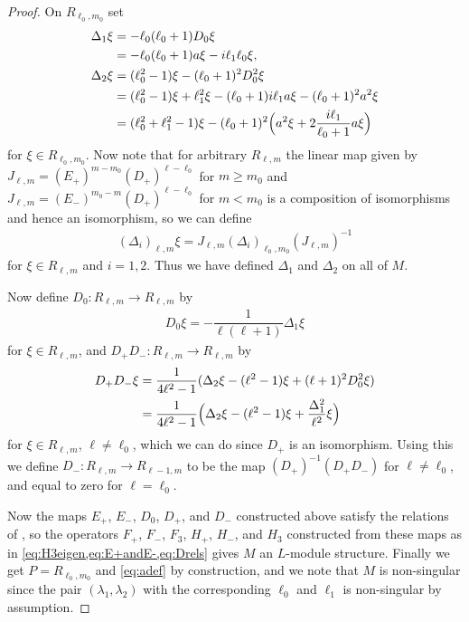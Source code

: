 \begin{proof}
  On $R_{\ell_0,m_0}$ set 
  \begin{align}
    \begin{aligned}
      \Delta_1 \xi &= -\ell_0(\ell_0+1)D_0\xi \\
      &= -\ell_0(\ell_0+1)a\xi - i\ell_1\ell_0\xi, \\
      \Delta_2 \xi &= (\ell_0^2-1)\xi - (\ell_0+1)^2D_0^2\xi \\
      &= (\ell_0^2-1)\xi + \ell_1^2\xi - (\ell_0+1)i\ell_1a\xi - (\ell_0+1)^2a^2\xi \\
      &= (\ell_0^2+\ell_1^2-1)\xi - (\ell_0+1)^2\Bigl( a^2\xi + 2\dfrac{i\ell_1}{\ell_0+1}a\xi \Bigr)
    \end{aligned}
  \end{align}
  for $\xi \in R_{\ell_0,m_0}$. Now note that for arbitrary $R_{\ell,m}$ the linear map given by $J_{\ell,m}=(E_+)^{m-m_0}(D_+)^{\ell-\ell_0}$ for $m\geq m_0$ and $J_{\ell,m}=(E_-)^{m_0-m}(D_+)^{\ell-\ell_0}$ for $m<m_0$ is a composition of isomorphisms and hence an isomorphism, so we can define 
  \begin{align*}
    (\Delta_i)_{\ell,m}\xi = J_{\ell,m}(\Delta_i)_{\ell_0,m_0} (J_{\ell,m})^{-1}
  \end{align*}
  for $\xi\in R_{\ell,m}$ and $i=1,2$. Thus we have defined $\Delta_1$ and $\Delta_2$ on all of $M$.
  
  Now define $D_0\colon R_{\ell,m}\to R_{\ell,m}$ by 
  \begin{align*}
    D_0\xi = -\dfrac{1}{\ell(\ell+1)}\Delta_1 \xi
  \end{align*}
  for $\xi\in R_{\ell,m}$, and $D_+D_-\colon R_{\ell,m}\to R_{\ell,m}$ by 
  \begin{align*}
    D_+D_-\xi &= \dfrac{1}{4\ell^2-1}(\Delta_2\xi - (\ell^2-1)\xi + (\ell+1)^2D_0^2\xi) \\
    &= \dfrac{1}{4\ell^2-1}\Bigl(\Delta_2\xi - (\ell^2-1)\xi + \dfrac{\Delta_1^2}{\ell^2}\xi\Bigr)
  \end{align*}
  for $\xi \in R_{\ell,m}$, $\ell\neq \ell_0$, which we can do since $D_+$ is an isomorphism. Using this we define $D_-\colon R_{\ell,m}\to R_{\ell-1,m}$ to be the map $(D_+)^{-1}(D_+D_-)$ for $\ell\neq \ell_0$, and equal to zero for $\ell=\ell_0$. 

  Now the maps $E_+$, $E_-$, $D_0$, $D_+$, and $D_-$ constructed above satisfy the relations of ,  so the operators $F_+$, $F_-$, $F_3$, $H_+$, $H_-$, and $H_3$ constructed from these maps as in \cref{eq:H3eigen,eq:E+andE-,eq:Drels} gives $M$ an $L$-module structure. Finally we get $P=R_{\ell_0,m_0}$ and \cref{eq:adef} by construction, and we note that $M$ is non-singular since the pair $(\lambda_1,\lambda_2)$ with the corresponding $\ell_0$ and $\ell_1$ is non-singular by assumption.
\end{proof}

